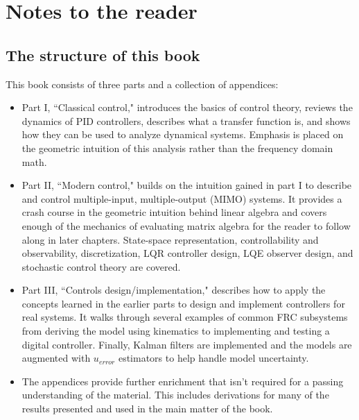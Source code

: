 
\setcounter{chapter}{-1}
\chapter{Notes to the reader}

\section{The structure of this book}

This book consists of three parts and a collection of appendices:

\begin{itemize}
  \item Part I, ``Classical control," introduces the basics of control theory,
    reviews the dynamics of PID controllers, describes what a transfer function
    is, and shows how they can be used to analyze dynamical systems. Emphasis is
    placed on the geometric intuition of this analysis rather than the frequency
    domain math.
  \item Part II, ``Modern control," builds on the intuition gained in part I to
    describe and control multiple-input, multiple-output (MIMO) systems. It
    provides a crash course in the geometric intuition behind linear algebra and
    covers enough of the mechanics of evaluating matrix algebra for the reader
    to follow along in later chapters. State-space representation,
    controllability and observability, discretization, LQR controller design,
    LQE observer design, and stochastic control theory are covered.
  \item Part III, ``Controls design/implementation," describes how to apply the
    concepts learned in the earlier parts to design and implement controllers
    for real systems. It walks through several examples of common FRC subsystems
    from deriving the model using kinematics to implementing and testing a
    digital controller. Finally, Kalman filters are implemented and the models
    are augmented with $u_{error}$ estimators to help handle model uncertainty.
  \item The appendices provide further enrichment that isn't required for a
    passing understanding of the material. This includes derivations for many of
    the results presented and used in the main matter of the book.
\end{itemize}

